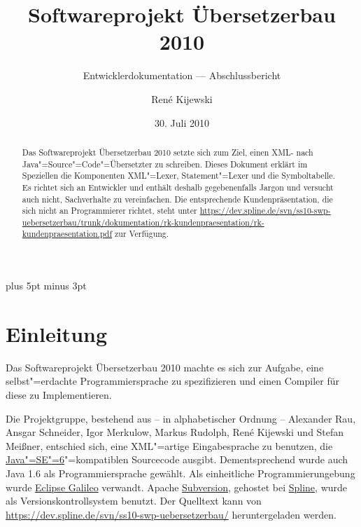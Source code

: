 \documentclass[10pt,a4paper,ngerman,titlepage,tocindentauto]{scrartcl}
\newcommand{\link}[1]{\href{#1}{#1}}
\newcommand{\n}{\linebreak[1]}
\begin{document}
	\begin{titlepage}
		\titlehead{\texttt{[image: graphiken/Fub-logo.pdf]}}
		\title{Softwareprojekt Übersetzerbau 2010} 
		\subtitle{Entwicklerdokumentation --- Abschlussbericht}
		\author{René Kijewski} 
		\date{30. Juli 2010 \vfill}
		\maketitle
	\end{titlepage}
	
	\begin{abstract}
		Das Softwareprojekt Übersetzerbau 2010 setzte sich zum Ziel, einen XML- nach Java"=Source"=Code"=Übersetzter
		zu schreiben.
		Dieses Dokument erklärt im Speziellen die Komponenten XML"=Lexer, Statement"=Lexer
		und die Symboltabelle. Es richtet sich an Entwickler und enthält deshalb gegebenenfalls
		Jargon und versucht auch nicht, Sachverhalte zu vereinfachen.
		Die entsprechende Kundenpräsentation, die sich nicht an Programmierer richtet, steht unter
		\href{https://dev.spline.de/svn/ss10-swp-uebersetzerbau/trunk/dokumentation/rk-kundenpraesentation/rk-kundenpraesentation.pdf}
		{https://{\n}dev.spline.de/{\n}svn/{\n}ss10-swp-uebersetzerbau/{\n}trunk/dokumentation/{\n}rk-kundenpraesentation/{\n}rk-kundenpraesentation.pdf}
		zur Verfügung.
	\end{abstract}

	{
		\pagestyle{empty}
		\tableofcontents
		\newpage
	}
	
	\parskip 7pt plus 5pt minus 3pt
	\section{Einleitung}
		Das Softwareprojekt Übersetzerbau 2010 machte es sich zur Aufgabe, eine selbst"=erdachte Programmiersprache
		zu spezifizieren und einen Compiler für diese zu Implementieren.
		
		Die Projektgruppe, bestehend aus -- in alphabetischer Ordnung --
			Alexander Rau,
			Ansgar Schneider,
			Igor Merkulow,
			Markus Rudolph,
			René Kijewski und
			Stefan Meißner,
		entschied sich, eine XML"=artige Eingabesprache zu benutzen, die
		\href{http://java.sun.com/javase/6/}{Java"=SE"=6}"=kompatiblen Sourcecode ausgibt.
		Dementsprechend wurde auch Java 1.6 als Programmiersprache gewählt.
		Als einheitliche Programmierungebung wurde \href{http://www.eclipse.org/galileo/}{Eclipse Galileo} verwandt.
		Apache \href{http://subversion.apache.org/}{Subversion}, gehostet bei \href{http://dev.spline.de/}{Spline}, wurde als
		Versionskontrollsystem benutzt. Der Quelltext kann von \link{https://dev.spline.de/svn/ss10-swp-uebersetzerbau/}
		heruntergeladen werden.
		
\end{document}
